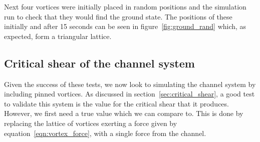\documentclass{article}
\numberwithin{equation}{section}
\begin{document}
Next four vortices were initially placed in random positions and the simulation run to check that they would find the ground state. The positions of these initially and after 15 seconds can be seen in figure~\ref{fig:ground_rand} which, as expected, form a triangular lattice.

\subsection{Critical shear of the channel system} \label{sec:comp_crit_chear}
Given the success of these tests, we now look to simulating the channel system by including pinned vortices. As discussed in section~\ref{sec:critical_shear}, a good test to validate this system is the value for the critical shear that it produces. However, we first need a true value which we can compare to. This is done by replacing the lattice of vortices exerting a force given by equation~\ref{eqn:vortex_force}, with a single force from the channel.
\end{document}
